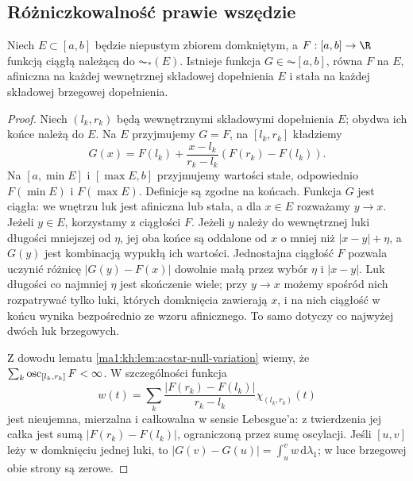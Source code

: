 \subsection{Różniczkowalność prawie wszędzie}
\begin{lemat}
\label{ma1:kh:lem:acstar-affine-extension}\label{it:lem:acstar-affine-extension}
Niech $E\subset[a,b]$ będzie niepustym zbiorem domkniętym, a $F:[a,b]\to\R$ funkcją ciągłą należącą do $\AC_*(E)$. Istnieje funkcja $G\in\AC[a,b]$, równa $F$ na $E$, afiniczna na każdej wewnętrznej składowej dopełnienia $E$ i stała na każdej składowej brzegowej dopełnienia.
\end{lemat}
\begin{proof}
Niech $(l_k,r_k)$ będą wewnętrznymi składowymi dopełnienia $E$; obydwa ich końce należą do $E$. Na $E$ przyjmujemy $G=F$, na $[l_k,r_k]$ kładziemy
\[
 G(x)=F(l_k)+\frac{x-l_k}{r_k-l_k}(F(r_k)-F(l_k)).
\]
Na $[a,\min E]$ i $[\max E,b]$ przyjmujemy wartości stałe, odpowiednio $F(\min E)$ i $F(\max E)$. Definicje są zgodne na końcach. Funkcja $G$ jest ciągła: we wnętrzu luk jest afiniczna lub stała, a dla $x\in E$ rozważamy $y\to x$. Jeżeli $y\in E$, korzystamy z ciągłości $F$. Jeżeli $y$ należy do wewnętrznej luki długości mniejszej od $\eta$, jej oba końce są oddalone od $x$ o mniej niż $|x-y|+\eta$, a $G(y)$ jest kombinacją wypukłą ich wartości. Jednostajna ciągłość $F$ pozwala uczynić różnicę $|G(y)-F(x)|$ dowolnie małą przez wybór $\eta$ i $|x-y|$. Luk długości co najmniej $\eta$ jest skończenie wiele; przy $y\to x$ możemy spośród nich rozpatrywać tylko luki, których domknięcia zawierają $x$, i na nich ciągłość w końcu wynika bezpośrednio ze wzoru afinicznego. To samo dotyczy co najwyżej dwóch luk brzegowych.

Z dowodu lematu \ref{ma1:kh:lem:acstar-null-variation} wiemy, że $\sum_k\operatorname{osc}_{[l_k,r_k]}F<\infty$. W szczególności funkcja
\[
 w(t)=\sum_k\frac{|F(r_k)-F(l_k)|}{r_k-l_k}
             \chi_{(l_k,r_k)}(t)
\]
jest nieujemna, mierzalna i całkowalna w sensie Lebesgue'a: z twierdzenia  jej całka jest sumą $|F(r_k)-F(l_k)|$, ograniczoną przez sumę oscylacji. Jeśli $[u,v]$ leży w domknięciu jednej luki, to $|G(v)-G(u)|=\int_u^v w\,\mathrm d\lambda_1$; w luce brzegowej obie strony są zerowe.


\end{proof}
